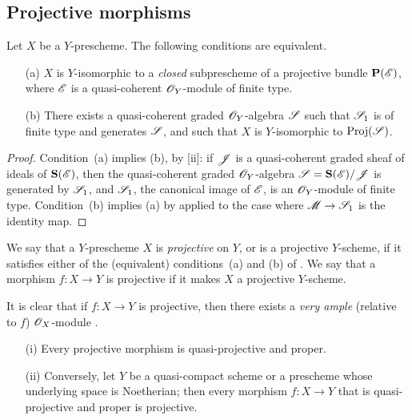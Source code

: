 \subsection{Projective morphisms}
\label{subsection:II.5.5}

\begin{proposition}[5.5.1]
\label{II.5.5.1}
Let $X$ be a $Y$-prescheme.
The following conditions are equivalent.
\begin{enumerate}
  \item[{\rm(a)}] $X$ is $Y$-isomorphic to a \emph{closed} subprescheme of a projective bundle $\mathbf{P}(\mathscr{E})$, where $\mathscr{E}$ is a quasi-coherent $\mathscr{O}_Y$-module of finite type.
  \item[{\rm(b)}] There exists a quasi-coherent graded $\mathscr{O}_Y$-algebra $\mathscr{S}$ such that $\mathscr{S}_1$ is of finite type and generates $\mathscr{S}$, and such that $X$ is $Y$-isomorphic to $\operatorname{Proj}(\mathscr{S})$.
\end{enumerate}
\end{proposition}

\begin{proof}
Condition~(a) implies (b), by [ii]: if $\mathscr{J}$ is a quasi-coherent graded sheaf of ideals of $\mathbf{S}(\mathscr{E})$, then the quasi-coherent graded $\mathscr{O}_Y$-algebra $\mathscr{S}=\mathbf{S}(\mathscr{E})/\mathscr{J}$ is generated by $\mathscr{S}_1$, and $\mathscr{S}_1$, the canonical image of $\mathscr{E}$, is an $\mathscr{O}_Y$-module of finite type.
Condition~(b) implies (a) by  applied to the case where $\sh{M}\to\sh{S}_1$ is the identity map.
\end{proof}

\begin{definition}[5.5.2]
\label{II.5.5.2}
We say that a $Y$-prescheme $X$ is \emph{projective} on $Y$, or is a projective $Y$-scheme, if it satisfies either of the (equivalent) conditions~(a) and (b) of .
We say that a morphism $f:X\to Y$ is projective if it makes $X$ a projective $Y$-scheme.
\end{definition}

It is clear that if $f:X\to Y$ is projective, then there exists a \emph{very ample} (relative to $f$) $\mathscr{O}_X$-module .
\begin{theorem}[5.5.3]
\label{II.5.5.3}
\medskip\noindent
\begin{enumerate}
  \item[{\rm(i)}] Every projective morphism is quasi-projective and proper.
  \item[{\rm(ii)}] Conversely, let $Y$ be a quasi-compact scheme or a prescheme whose underlying space is Noetherian; then every morphism $f:X\to Y$ that is quasi-projective and proper is projective.
\end{enumerate}
\end{theorem}

